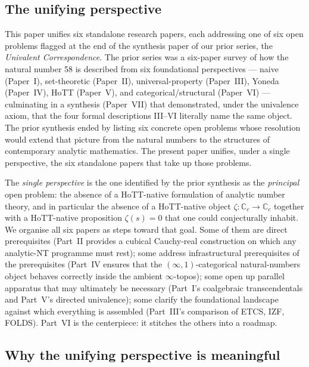 \documentclass[12pt]{article}
\theoremstyle{definition}
\theoremstyle{remark}
\newcommand{\C}{\mathbb{C}}
\newcommand{\Cc}{\C_{c}}
\begin{document}
\subsection{The unifying perspective}

This paper unifies six standalone research papers, each addressing one of
six open problems flagged at the end of the synthesis paper of our prior
series, the \emph{Univalent Correspondence}. The prior series was a
six-paper survey of how the natural number 58 is described from six
foundational perspectives --- naive (Paper~I), set-theoretic (Paper~II),
universal-property (Paper~III), Yoneda (Paper~IV), HoTT (Paper~V), and
categorical/structural (Paper~VI) --- culminating in a synthesis (Paper~VII)
that demonstrated, under the univalence axiom, that the four formal
descriptions III--VI literally name the same object. The prior synthesis
ended by listing six concrete open problems whose resolution would extend
that picture from the natural numbers to the structures of contemporary
analytic mathematics. The present paper unifies, under a single perspective,
the six standalone papers that take up those problems.

The \emph{single perspective} is the one identified by the prior synthesis
as the \emph{principal} open problem: the absence of a HoTT-native
formulation of analytic number theory, and in particular the absence of a
HoTT-native object $\zeta : \Cc \to \Cc$ together with a HoTT-native
proposition $\zeta(s) = 0$ that one could conjecturally inhabit. We organise
all six papers as steps toward that goal. Some of them are direct
prerequisites (Part~II provides a cubical Cauchy-real construction on
which any analytic-NT programme must rest); some address infrastructural
prerequisites of the prerequisites (Part~IV ensures that the
$(\infty,1)$-categorical natural-numbers object behaves correctly inside
the ambient $\infty$-topos); some open up parallel apparatus that may
ultimately be necessary (Part~I's coalgebraic transcendentals and Part~V's
directed univalence); some clarify the foundational landscape against
which everything is assembled (Part~III's comparison of ETCS, IZF, FOLDS).
Part~VI is the centerpiece: it stitches the others into a roadmap.

\subsection{Why the unifying perspective is meaningful}
\end{document}
